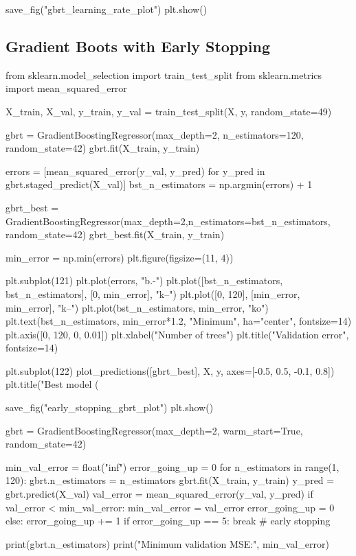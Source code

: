 \documentclass[%
oneside,                 %
final,                   %
10pt]{article}
\begin{document}
save_fig("gbrt_learning_rate_plot")
plt.show()

\epycod


\subsection{Gradient Boots with Early Stopping}
\bpycod

from sklearn.model_selection import train_test_split
from sklearn.metrics import mean_squared_error

X_train, X_val, y_train, y_val = train_test_split(X, y, random_state=49)

gbrt = GradientBoostingRegressor(max_depth=2, n_estimators=120, random_state=42)
gbrt.fit(X_train, y_train)

errors = [mean_squared_error(y_val, y_pred)
          for y_pred in gbrt.staged_predict(X_val)]
bst_n_estimators = np.argmin(errors) + 1

gbrt_best = GradientBoostingRegressor(max_depth=2,n_estimators=bst_n_estimators, random_state=42)
gbrt_best.fit(X_train, y_train)

min_error = np.min(errors)
plt.figure(figsize=(11, 4))

plt.subplot(121)
plt.plot(errors, "b.-")
plt.plot([bst_n_estimators, bst_n_estimators], [0, min_error], "k--")
plt.plot([0, 120], [min_error, min_error], "k--")
plt.plot(bst_n_estimators, min_error, "ko")
plt.text(bst_n_estimators, min_error*1.2, "Minimum", ha="center", fontsize=14)
plt.axis([0, 120, 0, 0.01])
plt.xlabel("Number of trees")
plt.title("Validation error", fontsize=14)

plt.subplot(122)
plot_predictions([gbrt_best], X, y, axes=[-0.5, 0.5, -0.1, 0.8])
plt.title("Best model (%

save_fig("early_stopping_gbrt_plot")
plt.show()


gbrt = GradientBoostingRegressor(max_depth=2, warm_start=True, random_state=42)

min_val_error = float("inf")
error_going_up = 0
for n_estimators in range(1, 120):
    gbrt.n_estimators = n_estimators
    gbrt.fit(X_train, y_train)
    y_pred = gbrt.predict(X_val)
    val_error = mean_squared_error(y_val, y_pred)
    if val_error < min_val_error:
        min_val_error = val_error
        error_going_up = 0
    else:
        error_going_up += 1
        if error_going_up == 5:
            break  # early stopping


print(gbrt.n_estimators)
print("Minimum validation MSE:", min_val_error)
\epycod
\end{document}
